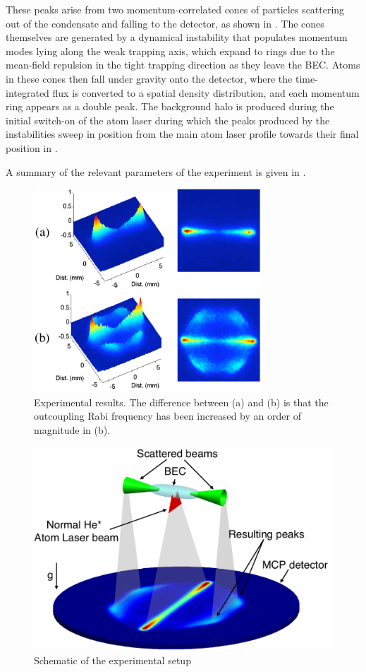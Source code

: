 These peaks arise from two momentum-correlated cones of particles scattering out of the condensate and falling to the detector, as shown in .  The cones themselves are generated by a dynamical instability that populates momentum modes lying along the weak trapping axis, which expand to rings due to the mean-field repulsion in the tight trapping direction as they leave the BEC.  Atoms in these cones then fall under gravity onto the detector, where the time-integrated flux is converted to a spatial density distribution, and each momentum ring appears as a double peak.  The background halo is produced during the initial switch-on of the atom laser during which the peaks produced by the instabilities sweep in position from the main atom laser profile towards their final position in .

A summary of the relevant parameters of the experiment is given in .

\begin{figure}
    \centering
        \includegraphics[height=3in]{ExperimentalResults}
    \caption{Experimental results. The difference between (a) and (b) is that the outcoupling Rabi frequency has been increased by an order of magnitude in (b).}
    \label{Peaks:ExperimentalResults}
\end{figure}

\begin{figure}
    \centering
        \includegraphics[height=3in]{Schematic}
    \caption{Schematic of the experimental setup}
    \label{Peaks:Schematic}
\end{figure}



